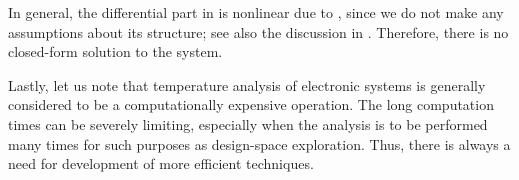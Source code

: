 In general, the differential part in  is
nonlinear due to \vp, since we do not make any assumptions about its structure;
see also the discussion in . Therefore, there is no
closed-form solution to the system.

Lastly, let us note that temperature analysis of electronic systems is generally
considered to be a computationally expensive operation. The long computation
times can be severely limiting, especially when the analysis is to be performed
many times for such purposes as design-space exploration. Thus, there is always
a need for development of more efficient techniques.

